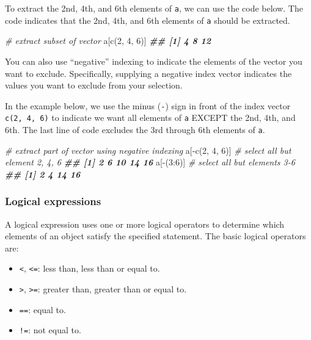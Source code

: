 \documentclass[
]{book}
\newenvironment{Shaded}{\begin{snugshade}}{\end{snugshade}}
\newcommand{\CommentTok}[1]{\textcolor[rgb]{0.56,0.35,0.01}{\textit{#1}}}
\newcommand{\DecValTok}[1]{\textcolor[rgb]{0.00,0.00,0.81}{#1}}
\newcommand{\DocumentationTok}[1]{\textcolor[rgb]{0.56,0.35,0.01}{\textbf{\textit{#1}}}}
\newcommand{\FunctionTok}[1]{\textcolor[rgb]{0.00,0.00,0.00}{#1}}
\newcommand{\NormalTok}[1]{#1}
\newcommand{\SpecialCharTok}[1]{\textcolor[rgb]{0.00,0.00,0.00}{#1}}
\providecommand{\tightlist}{%
  \setlength{\itemsep}{0pt}\setlength{\parskip}{0pt}}
\theoremstyle{definition}
\theoremstyle{definition}
\theoremstyle{definition}
\theoremstyle{definition}
\theoremstyle{remark}
\begin{document}
To extract the 2nd, 4th, and 6th elements of \texttt{a}, we can use the code below. The code indicates that the 2nd, 4th, and 6th elements of \texttt{a} should be extracted.

\begin{Shaded}
\begin{Highlighting}[]
\CommentTok{\# extract subset of vector}
\NormalTok{a[}\FunctionTok{c}\NormalTok{(}\DecValTok{2}\NormalTok{, }\DecValTok{4}\NormalTok{, }\DecValTok{6}\NormalTok{)]}
\DocumentationTok{\#\# [1]  4  8 12}
\end{Highlighting}
\end{Shaded}

You can also use ``negative'' indexing to indicate the elements of the vector you want to exclude. Specifically, supplying a negative index vector indicates the values you want to exclude from your selection.

In the example below, we use the minus (\texttt{-}) sign in front of the index vector \texttt{c(2,\ 4,\ 6)} to indicate we want all elements of \texttt{a} EXCEPT the 2nd, 4th, and 6th. The last line of code excludes the 3rd through 6th elements of \texttt{a}.

\begin{Shaded}
\begin{Highlighting}[]
\CommentTok{\# extract part of vector using negative indexing}
\NormalTok{a[}\SpecialCharTok{{-}}\FunctionTok{c}\NormalTok{(}\DecValTok{2}\NormalTok{, }\DecValTok{4}\NormalTok{, }\DecValTok{6}\NormalTok{)] }\CommentTok{\# select all but element 2, 4, 6}
\DocumentationTok{\#\# [1]  2  6 10 14 16}
\NormalTok{a[}\SpecialCharTok{{-}}\NormalTok{(}\DecValTok{3}\SpecialCharTok{:}\DecValTok{6}\NormalTok{)] }\CommentTok{\# select all but elements 3{-}6}
\DocumentationTok{\#\# [1]  2  4 14 16}
\end{Highlighting}
\end{Shaded}

\hypertarget{logical-expressions}{%
\subsubsection{Logical expressions}\label{logical-expressions}}

A logical expression uses one or more logical operators to determine which elements of an object satisfy the specified statement. The basic logical operators are:

\begin{itemize}
\tightlist
\item
  \texttt{\textless{}}, \texttt{\textless{}=}: less than, less than or equal to.
\item
  \texttt{\textgreater{}}, \texttt{\textgreater{}=}: greater than, greater than or equal to.
\item
  \texttt{==}: equal to.
\item
  \texttt{!=}: not equal to.
\end{itemize}
\end{document}
